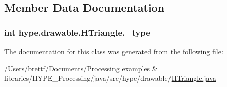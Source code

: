 \subsection{Member Data Documentation}
\hypertarget{classhype_1_1drawable_1_1_h_triangle_a39c67a955d8228ff3bd6d165ad25eebb}{
\subsubsection[{\-\_\-type}]{\setlength{\rightskip}{0pt plus 5cm}int hype.\-drawable.\-H\-Triangle.\-\_\-type\hspace{0.3cm}{\ttfamily [protected]}}}\label{classhype_1_1drawable_1_1_h_triangle_a39c67a955d8228ff3bd6d165ad25eebb}


The documentation for this class was generated from the following file\-:\begin{DoxyCompactItemize}
\item 
/\-Users/brettf/\-Documents/\-Processing examples \& libraries/\-H\-Y\-P\-E\-\_\-\-Processing/java/src/hype/drawable/\hyperlink{_h_triangle_8java}{H\-Triangle.\-java}\end{DoxyCompactItemize}
